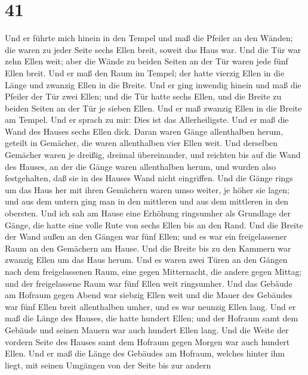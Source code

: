 \hypertarget{section-40}{%
\section{41}\label{section-40}}

 Und er führte mich hinein in den Tempel und maß die Pfeiler
an den Wänden; die waren zu jeder Seite sechs Ellen breit, soweit das
Haus war.  Und die Tür war zehn Ellen weit; aber die Wände
zu beiden Seiten an der Tür waren jede fünf Ellen breit. Und er maß den
Raum im Tempel; der hatte vierzig Ellen in die Länge und zwanzig Ellen
in die Breite.  Und er ging inwendig hinein und maß die
Pfeiler der Tür zwei Ellen; und die Tür hatte sechs Ellen, und die
Breite zu beiden Seiten an der Tür je sieben Ellen.  Und er
maß zwanzig Ellen in die Breite am Tempel. Und er sprach zu mir: Dies
ist das Allerheiligste.  Und er maß die Wand des Hauses
sechs Ellen dick. Daran waren Gänge allenthalben herum, geteilt in
Gemächer, die waren allenthalben vier Ellen weit.  Und
derselben Gemächer waren je dreißig, dreimal übereinander, und reichten
bis auf die Wand des Hauses, an der die Gänge waren allenthalben herum,
und wurden also festgehalten, daß sie in des Hauses Wand nicht
eingriffen.  Und die Gänge rings um das Haus her mit ihren
Gemächern waren umso weiter, je höher sie lagen; und aus dem untern ging
man in den mittleren und aus dem mittleren in den obersten. 
Und ich sah am Hause eine Erhöhung ringsumher als Grundlage der Gänge,
die hatte eine volle Rute von sechs Ellen bis an den Rand. 
Und die Breite der Wand außen an den Gängen war fünf Ellen; und es war
ein freigelassener Raum an den Gemächern am Hause.  Und die
Breite bis zu den Kammern war zwanzig Ellen um das Haus herum.
 Und es waren zwei Türen an den Gängen nach dem
freigelassenen Raum, eine gegen Mitternacht, die andere gegen Mittag;
und der freigelassene Raum war fünf Ellen weit ringsumher. 
Und das Gebäude am Hofraum gegen Abend war siebzig Ellen weit und die
Mauer des Gebäudes war fünf Ellen breit allenthalben umher, und es war
neunzig Ellen lang.  Und er maß die Länge des Hauses, die
hatte hundert Ellen; und der Hofraum samt dem Gebäude und seinen Mauern
war auch hundert Ellen lang.  Und die Weite der vordern
Seite des Hauses samt dem Hofraum gegen Morgen war auch hundert Ellen.
 Und er maß die Länge des Gebäudes am Hofraum, welches
hinter ihm liegt, mit seinen Umgängen von der Seite bis zur andern
